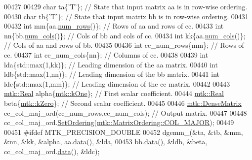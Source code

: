 \begin{DoxyCode}
00427 
00429   \textcolor{keywordtype}{char} ta\{\textcolor{charliteral}{'T'}\}; \textcolor{comment}{// State that input matrix aa is in row-wise ordering.}
00430   \textcolor{keywordtype}{char} tb\{\textcolor{charliteral}{'T'}\}; \textcolor{comment}{// State that input matrix bb is in row-wise ordering.}
00431 
00432   \textcolor{keywordtype}{int} mm\{aa.\hyperlink{classmtk_1_1DenseMatrix_a53f3afb3b6a8d21854458aaa9663cc74}{num\_rows}()\};  \textcolor{comment}{// Rows of aa and rows of cc.}
00433   \textcolor{keywordtype}{int} nn\{bb.\hyperlink{classmtk_1_1DenseMatrix_a41747502d468c6728a4be31501b16e0e}{num\_cols}()\};  \textcolor{comment}{// Cols of bb and cols of cc.}
00434   \textcolor{keywordtype}{int} kk\{aa.\hyperlink{classmtk_1_1DenseMatrix_a41747502d468c6728a4be31501b16e0e}{num\_cols}()\};  \textcolor{comment}{// Cols of aa and rows of bb.}
00435 
00436   \textcolor{keywordtype}{int} cc\_num\_rows\{mm\};  \textcolor{comment}{// Rows of cc.}
00437   \textcolor{keywordtype}{int} cc\_num\_cols\{nn\};  \textcolor{comment}{// Columns of cc.}
00438 
00439   \textcolor{keywordtype}{int} lda\{std::max(1,kk)\};  \textcolor{comment}{// Leading dimension of the aa matrix.}
00440   \textcolor{keywordtype}{int} ldb\{std::max(1,nn)\};  \textcolor{comment}{// Leading dimension of the bb matrix.}
00441   \textcolor{keywordtype}{int} ldc\{std::max(1,mm)\};  \textcolor{comment}{// Leading dimension of the cc matrix.}
00442 
00443   \hyperlink{group__c01-roots_gac080bbbf5cbb5502c9f00405f894857d}{mtk::Real} alpha\{\hyperlink{group__c01-roots_ga26407c24d43b6b95480943340d285c71}{mtk::kOne}\}; \textcolor{comment}{// First scalar coefficient.}
00444   \hyperlink{group__c01-roots_gac080bbbf5cbb5502c9f00405f894857d}{mtk::Real} beta\{\hyperlink{group__c01-roots_ga59a451a5fae30d59649bcda274fea271}{mtk::kZero}\}; \textcolor{comment}{// Second scalar coefficient.}
00445 
00446   \hyperlink{classmtk_1_1DenseMatrix}{mtk::DenseMatrix} cc\_col\_maj\_ord(cc\_num\_rows,cc\_num\_cols); \textcolor{comment}{// Output matrix.}
00447 
00448   cc\_col\_maj\_ord.\hyperlink{classmtk_1_1DenseMatrix_a178e63f365cf8c547dc5020c60357f5e}{SetOrdering}(\hyperlink{namespacemtk_ga622801bd9f912d0f976c3e383f5f581ca34d2765ffc490951febdcca04bc4f7cd}{mtk::MatrixOrdering::COL\_MAJOR});
00449 
00451 \textcolor{preprocessor}{  #ifdef MTK\_PRECISION\_DOUBLE}
00452   dgemm\_(&ta, &tb, &mm, &nn, &kk, &alpha, aa.\hyperlink{classmtk_1_1DenseMatrix_a0c33b8a9e01d157c61ddbdf807c25d84}{data}(), &lda,
00453          bb.\hyperlink{classmtk_1_1DenseMatrix_a0c33b8a9e01d157c61ddbdf807c25d84}{data}(), &ldb, &beta, cc\_col\_maj\_ord.\hyperlink{classmtk_1_1DenseMatrix_a0c33b8a9e01d157c61ddbdf807c25d84}{data}(), &ldc);

\end{DoxyCode}

